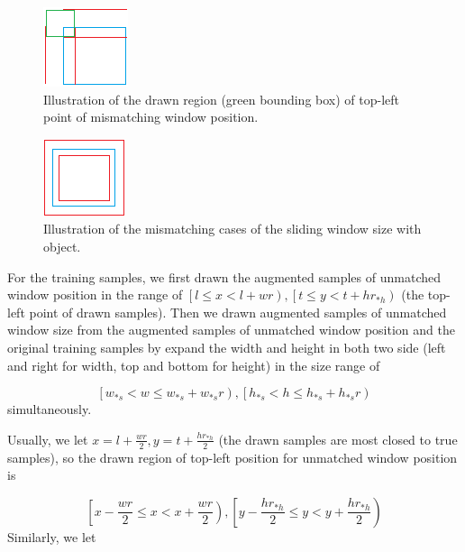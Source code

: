 \documentclass[runningheads,openany]{xhlPaper}
\begin{document}
\begin{figure}
\centering
\includegraphics[width=0.2\linewidth]{sliding_window_position_drawn_region}
\caption{Illustration of the drawn region (green bounding box) of top-left point of mismatching window position.}
\label{fig:sliding_window_position_drawn_region}
\end{figure}

\begin{figure}
\centering
\includegraphics[width=0.2\linewidth]{sliding_window_size_match}
\caption{Illustration of the mismatching cases of the sliding window size with object.}
\label{fig:sliding_window_size_match}
\end{figure}

For the training samples, we first drawn the augmented samples of unmatched window position in the range of $\left[ {l \le x < l + wr} \right), \left[ {t \le y < t + hr_{*h}} \right)$ (the top-left point of drawn samples). 
Then we drawn augmented samples of unmatched window size from the augmented samples of unmatched window position and the original training samples by expand the width and height in both two side (left and right for width, top and bottom for height) in the size range of 

\begin{displaymath}
\left[{w_{*s}} < w \le {w_{*s}} + {w_{*s}}r\right), \left[{h_{*s}} < h \le {h_{*s}} + {h_{*s}}r\right)
\end{displaymath}
simultaneously.

Usually, we let $x = l + \frac{{wr}}{2}, y = t + \frac{{hr_{*h}}}{2}$ (the drawn samples are most closed to true samples), so the drawn region of top-left position for unmatched window position is 

\begin{displaymath}
\left[ {x- \frac{{wr}}{2} \le x < x + \frac{{wr}}{2}} \right), \left[y - \frac{{h{r_{*h}}}}{2} \le y < y + \frac{{h{r_{*h}}}}{2}\right)
\end{displaymath}
Similarly, we let 
\end{document}
